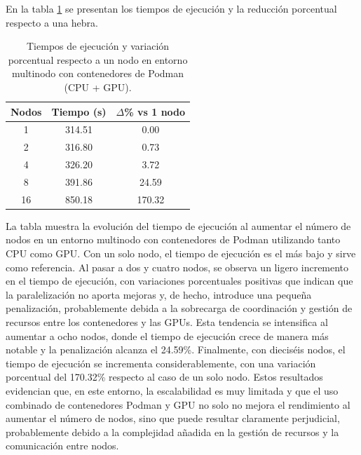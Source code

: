 En la tabla \ref{tab:multi-node_ubuntu_podman_gpu} se presentan los tiempos de ejecución y la reducción porcentual respecto a una hebra.

\begin{table}[ht]
    \centering
    \begin{tabular}{|c|c|c|}
        \hline
        \textbf{Nodos} & \textbf{Tiempo (s)} & \textbf{$\Delta$\% vs 1 nodo} \\
        \hline
        1              & 314.51              & 0.00                          \\
        2              & 316.80              & 0.73                          \\
        4              & 326.20              & 3.72                          \\
        8              & 391.86              & 24.59                         \\
        16             & 850.18              & 170.32                        \\
        \hline
    \end{tabular}
    \caption{Tiempos de ejecución y variación porcentual respecto a un nodo en entorno multinodo con contenedores de Podman (CPU + GPU).}
    \label{tab:multi-node_ubuntu_podman_gpu}
\end{table}

La tabla muestra la evolución del tiempo de ejecución al aumentar el número de nodos en un entorno multinodo con contenedores de Podman utilizando tanto CPU como GPU. Con un solo nodo, el tiempo de ejecución es el más bajo y sirve como referencia. Al pasar a dos y cuatro nodos, se observa un ligero incremento en el tiempo de ejecución, con variaciones porcentuales positivas que indican que la paralelización no aporta mejoras y, de hecho, introduce una pequeña penalización, probablemente debida a la sobrecarga de coordinación y gestión de recursos entre los contenedores y las GPUs. Esta tendencia se intensifica al aumentar a ocho nodos, donde el tiempo de ejecución crece de manera más notable y la penalización alcanza el 24.59\%. Finalmente, con dieciséis nodos, el tiempo de ejecución se incrementa considerablemente, con una variación porcentual del 170.32\% respecto al caso de un solo nodo. Estos resultados evidencian que, en este entorno, la escalabilidad es muy limitada y que el uso combinado de contenedores Podman y GPU no solo no mejora el rendimiento al aumentar el número de nodos, sino que puede resultar claramente perjudicial, probablemente debido a la complejidad añadida en la gestión de recursos y la comunicación entre nodos.

